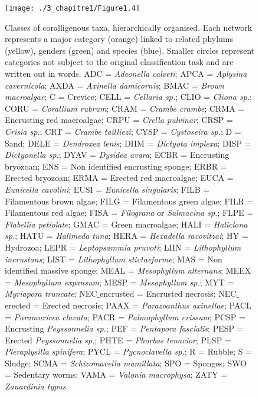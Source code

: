 \begin{figure}[H]
	\begin{center}
	\texttt{[image: ./3\_chapitre1/Figure1.4]}
		\caption[Classes of coralligenous taxa, hierarchically organised]{Classes of coralligenous taxa, hierarchically organised. Each network represents a major category (orange) linked to related phylums (yellow), genders (green) and species (blue). Smaller circles represent categories not subject to the original classification task and are written out in words. ADC = \textit{Adeonella calveti}; APCA = \textit{Aplysina cavernicola}; AXDA = \textit{Axinella damicornis}; BMAC = \textit{Brown macroalgae}; C = Crevice; CELL = \textit{Cellaria sp.}; CLIO = \textit{Cliona sp.}; CORU = \textit{Corallium rubrum}; CRAM = \textit{Crambe crambe}; CRMA = Encrusting red macroalgae; CRPU = \textit{Crella pulvinar}; CRSP = \textit{Crisia sp.}; CRT = \textit{Crambe tailliezi}; CYSP = \textit{Cystoseira sp.}; D = Sand; DELE = \textit{Dendroxea lenis}; DIIM = \textit{Dictyota implexa}; DISP = \textit{Dictyonella sp.}; DYAV = \textit{Dysidea avara}; ECBR = Encrusting bryozoan; ENS = Non identified encrusting sponge; ERBR = Erected bryozoan; ERMA = Erected red macroalgae; EUCA = \textit{Eunicella cavolini}; EUSI = \textit{Eunicella singularis}; FILB = Filamentous brown algae; FILG = Filamentous green algae; FILR = Filamentous red algae; FISA = \textit{Filograna} or \textit{Salmacina sp.}; FLPE = \textit{Flabellia petiolate}; GMAC = Green macroalgae; HALI = \textit{Haliclona sp.}; HATU = \textit{Halimeda tuna}; HERA = \textit{Hexadella racovitzai}; HY = Hydrozoa; LEPR = \textit{Leptopsammia pruvoti}; LIIN = \textit{Lithophyllum incrustans}; LIST = \textit{Lithophyllum stictaeforme}; MAS = Non identified massive sponge; MEAL = \textit{Mesophyllum alternans}; MEEX = \textit{Mesophyllum expansum}; MESP = \textit{Mesophyllum sp.}; MYT = \textit{Myriapora truncate}; NEC$\_$encrusted = Encrusted necrosis; NEC$\_$erected = Erected necrosis; PAAX = \textit{Parazoanthus axinellae}; PACL = \textit{Paramuricea clavata}; PACR = \textit{Palmophyllum crissum}; PCSP = Encrusting \textit{Peyssonnelia sp.}; PEF = \textit{Pentapora fascialis}; PESP = Erected \textit{Peyssonnelia sp.}; PHTE = \textit{Phorbas tenacior}; PLSP = \textit{Pleraplysilla spinifera}; PYCL = \textit{Pycnoclavella sp.}; R = Rubble; S = Sludge; SCMA = \textit{Schizomavella mamillata}; SPO = Sponges; SWO = Sedentary worms; VAMA = \textit{Valonia macrophysa}; ZATY = \textit{Zanardinia typus}.}
	\label{figure1.4}
\end{center}
\end{figure}

